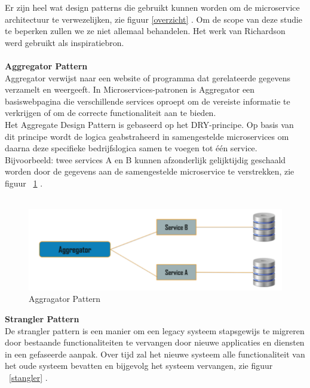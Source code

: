 Er zijn heel wat design patterns die gebruikt kunnen worden om de microservice architectuur te verwezelijken, zie figuur \ref{overzicht} . Om de scope van deze studie te beperken zullen we ze niet allemaal behandelen. Het werk van Richardson ~\autocite{Richardson2021} werd gebruikt als inspiratiebron.\\ \\
\textbf{Aggregator Pattern}\\
Aggregator verwijst naar een website of programma dat gerelateerde gegevens verzamelt en weergeeft. In Microservices-patronen is Aggregator een basiswebpagina die verschillende services oproept om de vereiste informatie te verkrijgen of om de correcte functionaliteit aan te bieden.\\
Het Aggregate Design Pattern is gebaseerd op het DRY-principe. Op basis van dit principe wordt de logica geabstraheerd in samengestelde microservices om daarna deze specifieke bedrijfslogica samen te voegen tot één service. ~\autocite{Kappaggantula2020} \\
Bijvoorbeeld: twee services A en B kunnen afzonderlijk gelijktijdig geschaald worden door de gegevens aan de samengestelde microservice te verstrekken, zie figuur ~\ref{aggragator} . \\ \\

\begin{figure}[!htb]
    \centering
    \includegraphics[width=1\textwidth]{Aggregator.png}
    \caption{Aggragator Pattern \label{aggragator}}
\end{figure}

\textbf{Strangler Pattern}\\
De strangler pattern is een manier om een legacy systeem stapsgewijs te migreren door bestaande functionaliteiten te vervangen door nieuwe applicaties en diensten in een gefaseerde aanpak. Over tijd zal het nieuwe systeem alle functionaliteit van het oude systeem bevatten en bijgevolg het systeem vervangen, zie figuur ~\ref{stangler} .


